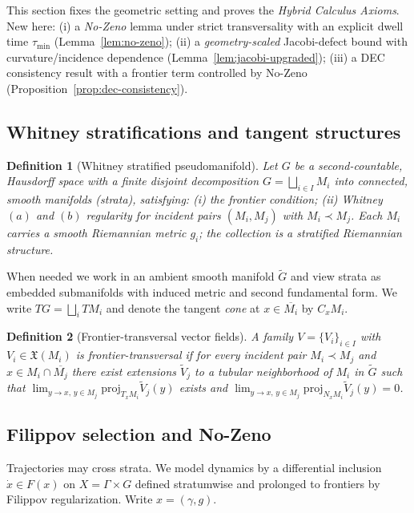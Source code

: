 \documentclass[10pt]{article}
\newtheorem{definition}{Definition}
\begin{document}
This section fixes the geometric setting and proves the \emph{Hybrid Calculus Axioms}. New here:
(i) a \emph{No-Zeno} lemma under strict transversality with an explicit dwell time $\tau_{\min}$ (Lemma~\ref{lem:no-zeno});
(ii) a \emph{geometry-scaled} Jacobi-defect bound with curvature/incidence dependence (Lemma~\ref{lem:jacobi-upgraded});
(iii) a DEC consistency result with a frontier term controlled by No-Zeno (Proposition~\ref{prop:dec-consistency}).

\subsection{Whitney stratifications and tangent structures}

\begin{definition}[Whitney stratified pseudomanifold]\label{def:whitney}
Let $G$ be a second-countable, Hausdorff space with a finite disjoint decomposition $G=\bigsqcup_{i\in I} M_i$ into connected, smooth manifolds (strata), satisfying: (i) the frontier condition; (ii) Whitney $(a)$ and $(b)$ regularity for incident pairs $(M_i,M_j)$ with $M_i\prec M_j$. Each $M_i$ carries a smooth Riemannian metric $g_i$; the collection is a \emph{stratified Riemannian structure}.
\end{definition}

When needed we work in an ambient smooth manifold $\widetilde G$ and view strata as embedded submanifolds with induced metric and second fundamental form. We write $TG=\bigsqcup_i TM_i$ and denote the tangent \emph{cone} at $x\in\overline{M_i}$ by $C_xM_i$.

\begin{definition}[Frontier-transversal vector fields]\label{def:transversal}
A family $V=\{V_i\}_{i\in I}$ with $V_i\in\mathfrak X(M_i)$ is \emph{frontier-transversal} if for every incident pair $M_i\prec M_j$ and $x\in M_i\cap\overline{M_j}$ there exist extensions $\widetilde V_j$ to a tubular neighborhood of $M_i$ in $\widetilde G$ such that $\lim_{y\to x,\,y\in M_j}\mathrm{proj}_{T_xM_i}\widetilde V_j(y)$ exists and $\lim_{y\to x,\,y\in M_j}\mathrm{proj}_{N_xM_i}\widetilde V_j(y)=0$.
\end{definition}

\subsection{Filippov selection and No-Zeno}\label{subsec:filippov-nozeno}

Trajectories may cross strata. We model dynamics by a differential inclusion $\dot x\in F(x)$ on $X=\Gamma\times G$ defined stratumwise and prolonged to frontiers by Filippov regularization. Write $x=(\gamma,g)$.
\end{document}
